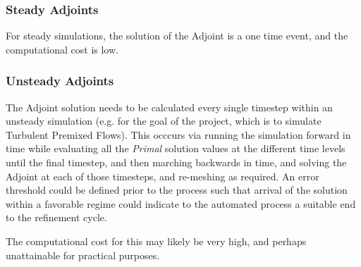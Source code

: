 \subsubsection{Steady Adjoints}

For steady simulations, the solution of the Adjoint is a one time event, and the computational cost is low.

\subsubsection{Unsteady Adjoints}
The Adjoint solution needs to be calculated every single timestep within an unsteady simulation (e.g. for the goal of the project, which is to simulate Turbulent Premixed Flows). This occcurs via running the simulation forward in time while evaluating all the \textit{Primal} solution values at the different time levels until the final timestep, and then marching backwards in time, and solving the Adjoint at each of those timesteps, and re-meshing as required. An error threshold could be defined prior to the process such that arrival of the solution within a favorable regime could indicate to the automated process a suitable end to the refinement cycle.\par
The computational cost for this may likely be very high, and perhaps unattainable for practical purposes.\par


